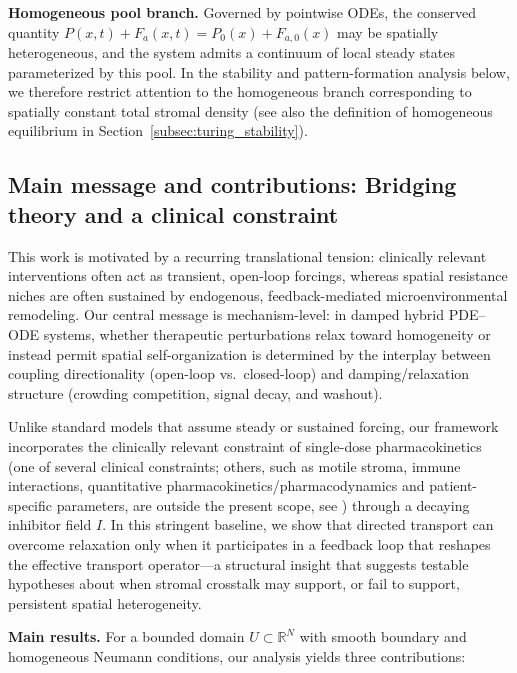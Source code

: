 \documentclass[pdflatex,sn-mathphys-ay]{sn-jnl}
\theoremstyle{thmstyleone}
\theoremstyle{definition}
\theoremstyle{remark}
\begin{document}
\medskip
\noindent\textbf{Homogeneous pool branch.}
Governed by pointwise ODEs, the conserved quantity $P(x,t)+F_a(x,t)=P_0(x)+F_{a,0}(x)$ may be spatially heterogeneous, and the system admits a continuum of local steady states parameterized by this pool. 
In the stability and pattern-formation analysis below, we therefore restrict attention to the homogeneous branch corresponding to spatially constant total stromal density (see also the definition of homogeneous equilibrium in Section~\ref{subsec:turing_stability}).

\subsection{Main message and contributions: Bridging theory and a clinical constraint}
\label{subsec:main_contrib}

This work is motivated by a recurring translational tension:
clinically relevant interventions often act as transient, open-loop forcings, whereas spatial resistance niches are often sustained by endogenous, feedback-mediated microenvironmental remodeling. 
Our central message is mechanism-level: in damped hybrid PDE--ODE systems, whether therapeutic perturbations relax toward homogeneity or instead permit spatial self-organization is determined by the interplay between coupling directionality (open-loop vs.\ closed-loop) and damping/relaxation structure (crowding competition, signal decay, and washout).

Unlike standard models that assume steady or sustained forcing, our framework incorporates the clinically relevant constraint of single-dose pharmacokinetics (one of several clinical constraints; others, such as motile stroma, immune interactions, quantitative pharmacokinetics/pharmacodynamics and patient-specific parameters, are outside the present scope, see ) through a decaying inhibitor field $I$. 
In this stringent baseline, we show that directed transport can overcome relaxation only when it participates in a feedback loop that reshapes the effective transport operator---a structural insight that suggests testable hypotheses about when stromal crosstalk may support, or fail to support, persistent spatial heterogeneity.

\medskip
\noindent\textbf{Main results.}
For a bounded domain $U\subset\mathbb{R}^N$ with smooth boundary and homogeneous Neumann conditions, our analysis yields three contributions:
\end{document}
